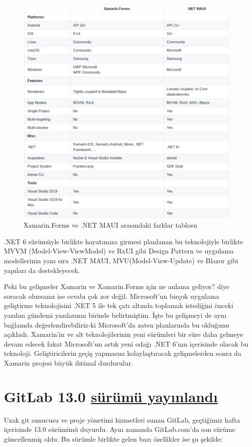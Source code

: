 \documentclass[11pt]{article}
\begin{document}
\begin{figure}[htbp]
\centering
\includegraphics[width=.9\linewidth]{gorseller/dotnet-maui-vs-xamarin-forms.png}
\caption{Xamarin.Forms ve .NET MAUI arasındaki farklar tablosu}
\end{figure}

.NET 6 sürümüyle birlikte hayatımıza girmesi planlanan bu teknolojiyle
birlikte MVVM (Model-View-ViewModel) ve RxUI gibi Design Pattern ve uygulama
modellerinin yanı sıra .NET MAUI, MVU(Model-View-Update) ve Blazor gibi
yapıları da destekleyecek.

Peki bu gelişmeler Xamarin ve Xamarin.Forms için ne anlama geliyor? diye
soracak olursanız ise cevabı çok zor değil. Microsoft'un birçok uygulama
geliştirme teknolojisini .NET 5 ile tek çatı altında toplamak istediğini
önceki yazılım gündemi yazılarının birinde belirtmiştim. İşte bu gelişmeyi de
aynı bağlamda değerlendirebiliriz-ki Microsoft'da zaten planlarında bu
olduğunu açıkladı. Xamarin'in ve alt teknolojilerinin yeni sürümleri bir süre
daha gelmeye devam edecek fakat Microsoft'un artık yeni odağı .NET 6'nın
içerisinde olacak bu teknoloji. Geliştiricilerin geçiş yapmasını
kolaylaştıracak gelişmelerden sonra da Xamarin projesi büyük ihtimal
durdurulur.
\section{GitLab 13.0 \href{https://about.gitlab.com/releases/2020/05/22/gitlab-13-0-released/}{sürümü yayınlandı}}
\label{sec:orgc9b748c}
Uzak git sunucusu ve proje yönetimi hizmetleri sunan GitLab, geçtiğimiz hafta
içerisinde 13.0 sürümünü duyurdu. Aynı zamanda GitLab.com'da son sürüme
güncellenmiş oldu. Bu sürümle birlikte gelen bazı özellikler ise şu şekilde:
\end{document}

